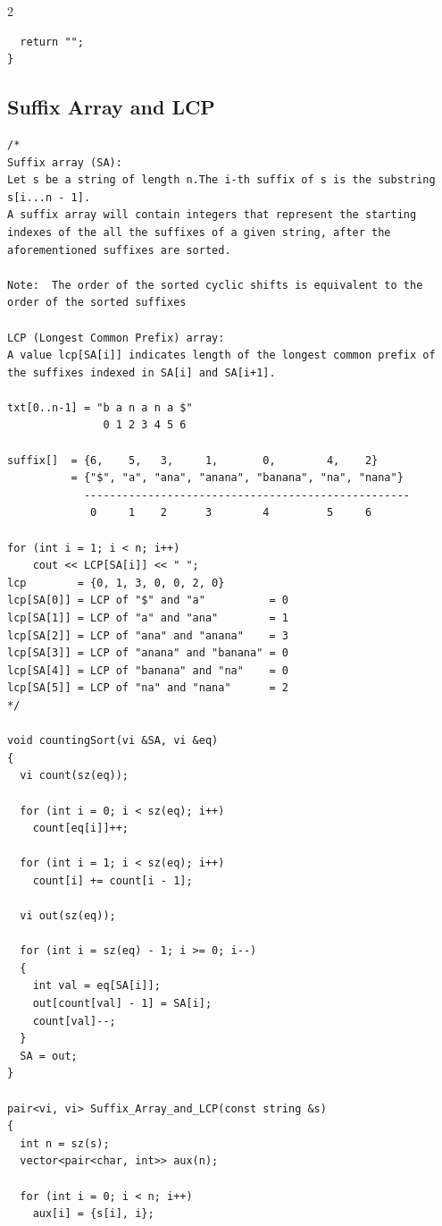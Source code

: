 \documentclass[twoside]{article}
\begin{document}
\begin{multicols*}{2}
\begin{verbatim}
  return "";
}
\end{verbatim}

	{
		\subsection*{Suffix Array and LCP}
	}
	\begin{verbatim}
/*
Suffix array (SA):
Let s be a string of length n.The i-th suffix of s is the substring
s[i...n - 1].
A suffix array will contain integers that represent the starting indexes of the all the suffixes of a given string, after the aforementioned suffixes are sorted.

Note:  The order of the sorted cyclic shifts is equivalent to the order of the sorted suffixes

LCP (Longest Common Prefix) array:
A value lcp[SA[i]] indicates length of the longest common prefix of the suffixes indexed in SA[i] and SA[i+1]. 

txt[0..n-1] = "b a n a n a $"
               0 1 2 3 4 5 6

suffix[]  = {6,    5,   3,     1,       0,        4,    2}
          = {"$", "a", "ana", "anana", "banana", "na", "nana"}
            ---------------------------------------------------
             0     1    2      3        4         5     6

for (int i = 1; i < n; i++)
    cout << LCP[SA[i]] << " "; 
lcp        = {0, 1, 3, 0, 0, 2, 0}
lcp[SA[0]] = LCP of "$" and "a"          = 0
lcp[SA[1]] = LCP of "a" and "ana"        = 1
lcp[SA[2]] = LCP of "ana" and "anana"    = 3
lcp[SA[3]] = LCP of "anana" and "banana" = 0
lcp[SA[4]] = LCP of "banana" and "na"    = 0
lcp[SA[5]] = LCP of "na" and "nana"      = 2
*/

void countingSort(vi &SA, vi &eq)
{
  vi count(sz(eq));

  for (int i = 0; i < sz(eq); i++)
    count[eq[i]]++;

  for (int i = 1; i < sz(eq); i++)
    count[i] += count[i - 1];

  vi out(sz(eq));

  for (int i = sz(eq) - 1; i >= 0; i--)
  {
    int val = eq[SA[i]];
    out[count[val] - 1] = SA[i];
    count[val]--;
  }
  SA = out;
}

pair<vi, vi> Suffix_Array_and_LCP(const string &s)
{
  int n = sz(s);
  vector<pair<char, int>> aux(n);

  for (int i = 0; i < n; i++)
    aux[i] = {s[i], i};


\end{verbatim}
\end{multicols*}
\end{document}
